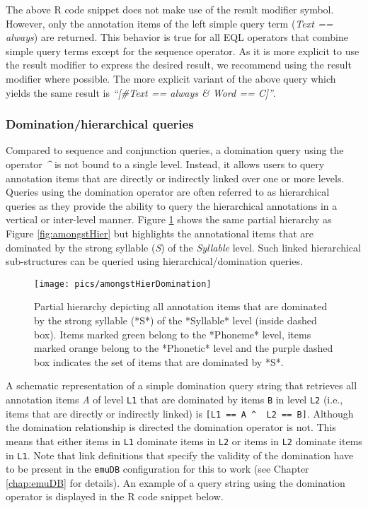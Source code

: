 \documentclass[
]{book}
\begin{document}
The above R code snippet does not make use of the result modifier symbol. However, only the annotation items of the left simple query term (\emph{Text == always}) are returned. This behavior is true for all EQL operators that combine simple query terms except for the sequence operator. As it is more explicit to use the result modifier to express the desired result, we recommend using the result modifier where possible. The more explicit variant of the above query which yields the same result is \emph{``{[}\#Text == always \& Word == C{]}''}.

\hypertarget{subsubsec:query-dominationQueries}{%
\subsubsection{Domination/hierarchical queries}\label{subsubsec:query-dominationQueries}}

Compared to sequence and conjunction queries, a domination query using the operator \emph{\^{}} is not bound to a single level. Instead, it allows users to query annotation items that are directly or indirectly linked over one or more levels. Queries using the domination operator are often referred to as hierarchical queries as they provide the ability to query the hierarchical annotations in a vertical or inter-level manner. Figure \ref{fig:amongstHierDomintation} shows the same partial hierarchy as Figure \ref{fig:amongstHier} but highlights the annotational items that are dominated by the strong syllable (\emph{S}) of the \emph{Syllable} level. Such linked hierarchical sub-structures can be queried using hierarchical/domination queries.

\begin{figure}

{\centering \texttt{[image: pics/amongstHierDomination]} 

}

\caption{Partial hierarchy depicting all annotation items that are dominated by the strong syllable (*S*) of the *Syllable* level (inside dashed box). Items marked green belong to the *Phoneme* level, items marked orange belong to the *Phonetic* level and the purple dashed box indicates the set of items that are dominated by *S*.}\label{fig:amongstHierDomintation}
\end{figure}

A schematic representation of a simple domination query string that retrieves all annotation items \emph{A} of level \texttt{L1} that are dominated by items \texttt{B} in level \texttt{L2} (i.e., items that are directly or indirectly linked) is \texttt{{[}L1\ ==\ A\ \^{}\ \ L2\ ==\ B{]}}. Although the domination relationship is directed the domination operator is not. This means that either items in \texttt{L1} dominate items in \texttt{L2} or items in \texttt{L2} dominate items in \texttt{L1}. Note that link definitions that specify the validity of the domination have to be present in the \texttt{emuDB} configuration for this to work (see Chapter \ref{chap:emuDB} for details). An example of a query string using the domination operator is displayed in the R code snippet below.
\end{document}
